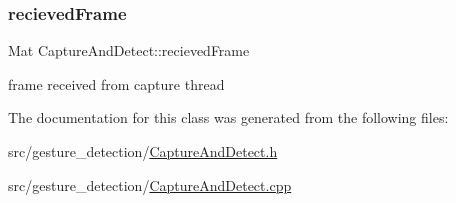 \subsubsection{\texorpdfstring{recieved\+Frame}{recievedFrame}}
{\footnotesize\ttfamily Mat Capture\+And\+Detect\+::recieved\+Frame}



frame received from capture thread 



The documentation for this class was generated from the following files\+:\begin{DoxyCompactItemize}
\item 
src/gesture\+\_\+detection/\hyperlink{CaptureAndDetect_8h}{Capture\+And\+Detect.\+h}\item 
src/gesture\+\_\+detection/\hyperlink{CaptureAndDetect_8cpp}{Capture\+And\+Detect.\+cpp}\end{DoxyCompactItemize}
